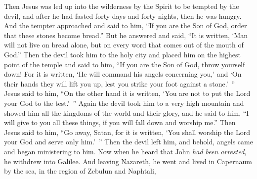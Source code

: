 \begin{biblechapter} %
 Then Jesus was led up into the wilderness by the Spirit to be tempted by the devil,
\verse and after he had fasted forty days and forty nights, then he was hungry.
\verse And the tempter approached and said to him, “If you are the Son of God, order that these stones become bread.”
\verse But he answered and said, “It is written, ‘Man will not live on bread alone, but on every word that comes out of the mouth of God.”
\verse Then the devil took him to the holy city and placed him on the highest point of the temple
\verse and said to him, “If you are the Son of God, throw yourself down! For it is written, ‘He will command his angels concerning you,’ and ‘On their hands they will lift you up, 
lest you strike your foot against a stone.’ ”
\verse Jesus said to him, “On the other hand it is written, ‘You are not to put the Lord your God to the test.’ ”
\verse Again the devil took him to a very high mountain and showed him all the kingdoms of the world and their glory,
\verse and he said to him, “I will give to you all these things, if you will fall down and worship me.”
\verse Then Jesus said to him, “Go away, Satan, for it is written, ‘You shall worship the Lord your God and serve only him.’ ”
\verse Then the devil left him, and behold, angels came and began ministering to him.
 Now when he heard that John \textit{had been arrested}, he withdrew into Galilee.
\verse And leaving Nazareth, he went and lived in Capernaum by the sea, in the region of Zebulun and Naphtali,

\end{biblechapter}
